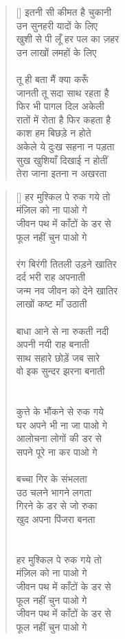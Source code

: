 \begin{verse}[\versewidth]
{इतनी सी कीमत है चुकानी\\
उन सुनहरी यादों के लिए\\
खुशी से पी लूँ हर पल का ज़हर\\
उन लाखों लमहों के लिए\\
\\
तू ही बता मैं क्या करूँ\\
जानती तू सदा साथ रहता है\\
फिर भी पागल दिल अकेली\\
रातों में रोता है फिर कहता है\\
काश हम बिछड़े न होते\\
अकेले ये दुःख सहना न पड़ता\\
सुख खुशियाँ दिखाई न होतीं\\
तेरा जाना इतना न अखरता
}\end{verse}

\begin{verse}[\versewidth]\texthindi{
हर मुश्किल पे रुक गये तो\\
मंज़िल को ना पाओ गे\\
जीवन पथ में काँटों के डर से\\
फूल नहीं चुन पाओ गे\\
\\
रंग बिरंगी तितली उड़ने खातिर\\
दर्द भरी राह अपनाती\\
जन्म नव जीवन को देने खातिर\\
लाखों कष्ट माँ उठाती\\
\\
बाधा आने से ना रुकती नदी\\
अपनी नयी राह बनाती\\
साथ सहारे छोड़ें जब सारे\\
वो इक सुन्दर झरना बनाती\\
\\
\\
कुत्ते के भौंकने से रुक गये\\
घर अपने भी ना जा पाओ गे\\
आलोचना लोगों की डर से\\
सपने पूरे ना कर पाओ गे\\
\\
बच्चा गिर के संभलता\\
उठ चलने भागने लगता\\
गिरने के डर से जो रुका\\
खुद अपना पिंजरा बनता\\
\\
\\
हर मुश्किल पे रुक गये तो\\
मंज़िल को ना पाओ गे\\
जीवन पथ में काँटों के डर से\\
फूल नहीं चुन पाओ गे\\
जीवन पथ में काँटों के डर से\\
फूल नहीं चुन पाओ गे
}\end{verse}


